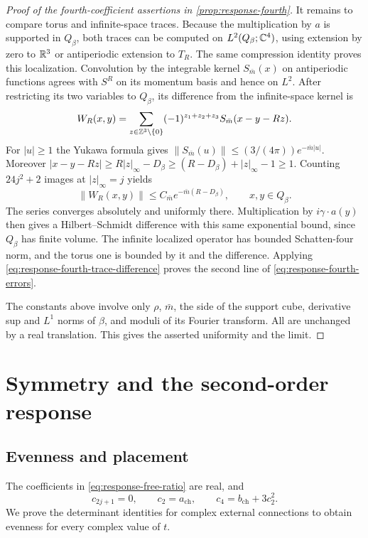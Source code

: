 \begin{proof}[Proof of the fourth-coefficient assertions in \cref{prop:response-fourth}]
It remains to compare torus and infinite-space traces.
Because the multiplication by $a$ is supported in
$Q_\beta$, both traces can be computed on $L^2(Q_\beta;\mathbb C^4)$,
using extension by zero to $\mathbb R^3$ or antiperiodic extension
to $T_R$. The same compression identity proves this
localization. Convolution by the integrable kernel
$S_{\bar m}(x)$ on antiperiodic functions agrees with
$S^R$ on its momentum basis and hence on $L^2$.
After restricting its two variables to $Q_\beta$, its
difference from the infinite-space kernel is
\[
 W_R(x,y)=\sum_{z\in\mathbb Z^3\setminus\{0\}}
                  (-1)^{z_1+z_2+z_3}S_{\bar m}(x-y-Rz).
\]
For $|u|\ge1$ the Yukawa formula gives
$\|S_{\bar m}(u)\|\le(3/(4\pi))e^{-\bar m|u|}$.
Moreover $|x-y-Rz|\ge R|z|_\infty-D_\beta\ge
(R-D_\beta)+|z|_\infty-1\ge1$. Counting
$24j^2+2$ images at $|z|_\infty=j$ yields
\[
 \|W_R(x,y)\|\le C_{\bar m}e^{-\bar m(R-D_\beta)},
 \qquad x,y\in Q_\beta.
\]
The series converges absolutely and uniformly there.
Multiplication by $i\gamma\cdot a(y)$ then gives a
Hilbert--Schmidt difference with this same exponential
bound, since $Q_\beta$ has finite volume. The infinite
localized operator has bounded Schatten-four norm,
and the torus one is bounded by it and the difference.
Applying \eqref{eq:response-fourth-trace-difference}
proves the second line of \eqref{eq:response-fourth-errors}.

The constants above involve only $\rho$, $\bar m$,
the side of the support cube, derivative sup and
$L^1$ norms of $\beta$, and moduli of its Fourier
transform. All are unchanged by a real translation.
This gives the asserted uniformity and the limit.
\end{proof}

\section{Symmetry and the second-order response}\label{subsec:response-symmetry}

\subsection{Evenness and placement}

The coefficients in \eqref{eq:response-free-ratio} are real, and
\begin{equation}\label{eq:response-coefficient-relations}
 c_{2j+1}=0,\qquad c_2=a_{\mathrm{ch}},\qquad
                 c_4=b_{\mathrm{ch}}+3c_2^2.
\end{equation}
We prove the determinant identities for complex external connections
to obtain evenness for every complex value of $t$.

